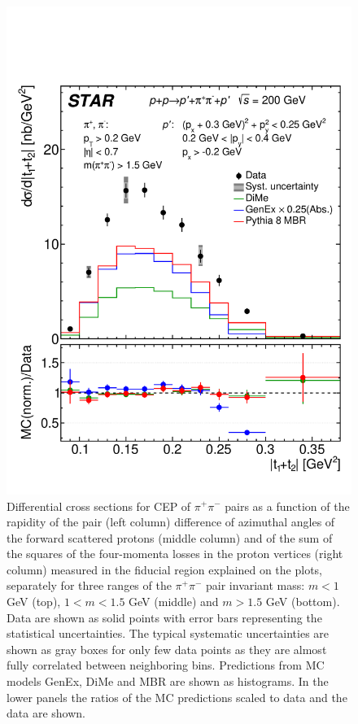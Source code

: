 \begin{figure}[h]
\hfill
\includegraphics[width=.31\textwidth,page=1]{graphics/physicsResults/Ratio_FinalResult_MandelstamTSum_pion_MassBin_3.pdf}
%
\caption[Differential cross sections for CEP of $\pi^+\pi^-$ pairs as a function of the rapidity of the pair, difference of azimuthal angles of the forward scattered protons and of the sum of the squares of the four-momenta losses in the proton vertices measured in the fiducial region explained on the plots, separately for three ranges of the $\pi^+\pi^-$ pair invariant mass: $m<1$ GeV, $1<m<1.5$ GeV and $m>1.5$ GeV.]{Differential cross sections for CEP of $\pi^+\pi^-$ pairs as a function of the rapidity of the pair (left column) difference of azimuthal angles of the forward scattered protons (middle column) and of the sum of the squares of the four-momenta losses in the proton vertices (right column) measured in the fiducial region explained on the plots, separately for three ranges of the $\pi^+\pi^-$ pair invariant mass: $m<1$ GeV (top), $1<m<1.5$ GeV (middle) and $m>1.5$ GeV (bottom). Data are shown as solid points with error bars representing the statistical uncertainties. The typical systematic uncertainties are shown as gray boxes for only few data points as they are almost fully correlated between neighboring bins. Predictions from MC models GenEx, DiMe and MBR are shown as histograms. In the lower panels the ratios of the MC predictions scaled to data and the data are shown.}
\label{results_4}
\end{figure}
%
%
